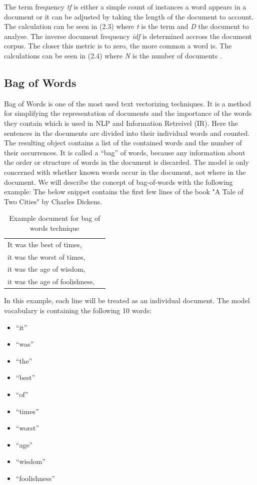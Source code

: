The term frequency \textit{tf} is either a simple count of instances a word appears in a document or it can be adjusted by taking the length of the document to account. The calculation can be seen in (2.3) where \textit{t} is the term and \textit{D} the document to analyse. The inverse document frequency \textit{idf} is determined accross the document corpus. The closer this metric is to zero, the more common a word is. The calculations can be seen in (2.4) where \textit{N} is the number of documents \cite{Sammut}.

\subsection{Bag of Words}
Bag of Words is one of the most used text vectorizing techniques. It is a method for simplifying the representation of documents and the importance of the words they contain which is used in NLP and Information Retreivel (IR). Here the sentences in the documents are divided into their individual words and counted. The resulting object contains a list of the contained words and the number of their occurrences. It is called a “bag” of words, because any information about the order or structure of words in the document is discarded. The model is only concerned with whether known words occur in the document, not where in the document. We will describe the concept of bag-of-words with the following example: The below snippet contains the first few lines of the book "A Tale of Two Cities" by Charles Dickens.

\begin{table}[H]
	\centering
	\begin{tabular}{ll}
		\hline
			It was the best of times,\\
			it was the worst of times,\\
			it was the age of wisdom,\\
			it was the age of foolishness, \\
		 \hline
	\end{tabular}
	\caption{Example document for bag of words technique}
	\label{tab:bow}
\end{table}

In this example, each line will be treated as an individual document. The model vocabulary is containing the following 10 words:
\begin{itemize}
	\item “it”
	\item “was”
	\item “the”
	\item “best”
	\item “of”
	\item “times”
	\item “worst”
	\item “age”
	\item “wisdom”
	\item “foolishness”
\end{itemize}

